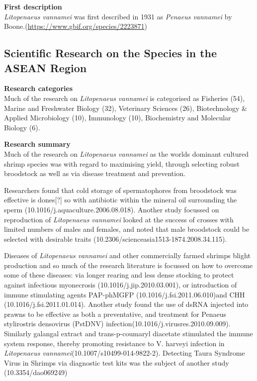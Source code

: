 \documentclass[]{book}
\theoremstyle{definition}
\theoremstyle{definition}
\theoremstyle{definition}
\theoremstyle{remark}
\begin{document}
\textbf{First description}\\
\emph{Litopenaeus vannamei} was first described in 1931 as \emph{Penaeus
vannamei} by Boone.(\url{https://www.gbif.org/species/2223871})

\hypertarget{scientific-research-on-the-species-in-the-asean-region-1}{%
\subsection{Scientific Research on the Species in the ASEAN
Region}\label{scientific-research-on-the-species-in-the-asean-region-1}}

\textbf{Research categories}\\
Much of the research on \emph{Litopenaeus vannamei} is categorised as
Fisheries (54), Marine and Freshwater Biology (32), Veterinary Sciences
(26), Biotechnology \& Applied Microbiology (10), Immunology (10),
Biochemistry and Molecular Biology (6).

\textbf{Research summary}\\
Much of the research on \emph{Litopenaeus vannamei} as the worlds
dominant cultured shrimp species was with regard to maximising yield,
through selecting robust broodstock as well as via disease treatment and
prevention.

Researchers found that cold storage of spermatophores from broodstock
was effective is dones{[}?{]} so with antibiotic within the mineral oil
surrounding the sperm (10.1016/j.aquaculture.2006.08.018). Another study
focussed on reproduction of \emph{Litopenaeus vannamei} looked at the
success of crosses with limited numbers of males and females, and noted
that male broodstock could be selected with desirable traits
(10.2306/scienceasia1513-1874.2008.34.115).

Diseases of \emph{Litopenaeus vannamei} and other commercially farmed
shrimps blight production and so much of the research literature is
focussed on how to overcome some of these diseases: via longer rearing
and less dense stocking to protect against infectious myonecrosis
(10.1016/j.jip.2010.03.001), or introduction of immune stimulating
agents PAP-phMGFP (10.1016/j.fsi.2011.06.010)and CHH
(10.1016/j.fsi.2011.01.014). Another study found the use of dsRNA
injected into prawns to be effective as both a preventative, and
treatment for Penaeus stylirostris densovirus (PstDNV)
infection(10.1016/j.virusres.2010.09.009). Similarly galangal extract
and trans-p-coumaryl diacetate stimulated the immune system response,
thereby promoting resistance to V. harveyi infection in
\emph{Litopenaeus vannamei}(10.1007/s10499-014-9822-2). Detecting Taura
Syndrome Virus in Shrimps via diagnostic test kits was the subject of
another study (10.3354/dao069249)
\end{document}
